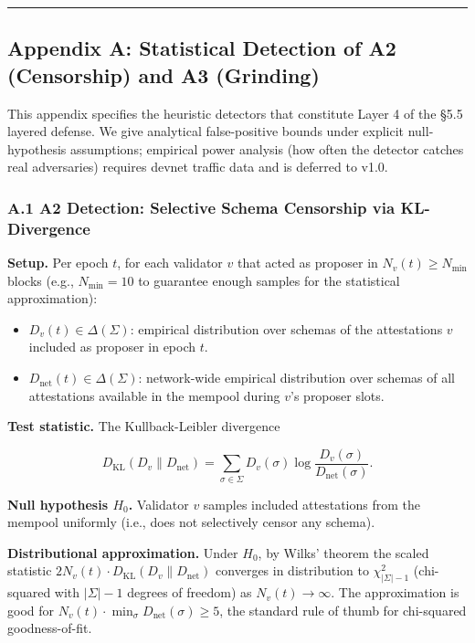 \documentclass[
  11pt,
]{article}
\providecommand{\tightlist}{%
  \setlength{\itemsep}{0pt}\setlength{\parskip}{0pt}}
\begin{document}
\begin{center}\rule{0.5\linewidth}{0.5pt}\end{center}

\subsection{Appendix A: Statistical Detection of A2 (Censorship) and A3
(Grinding)}\label{appendix-a-statistical-detection-of-a2-censorship-and-a3-grinding}

This appendix specifies the heuristic detectors that constitute Layer 4
of the §5.5 layered defense. We give analytical false-positive bounds
under explicit null-hypothesis assumptions; empirical power analysis
(how often the detector catches real adversaries) requires devnet
traffic data and is deferred to v1.0.

\subsubsection{A.1 A2 Detection: Selective Schema Censorship via
KL-Divergence}\label{a.1-a2-detection-selective-schema-censorship-via-kl-divergence}

\textbf{Setup.} Per epoch \(t\), for each validator \(v\) that acted as
proposer in \(N_v(t) \geq N_{\min}\) blocks (e.g., \(N_{\min} = 10\) to
guarantee enough samples for the statistical approximation):

\begin{itemize}
\tightlist
\item
  \(D_v(t) \in \Delta(\Sigma)\): empirical distribution over schemas of
  the attestations \(v\) included as proposer in epoch \(t\).
\item
  \(D_{\text{net}}(t) \in \Delta(\Sigma)\): network-wide empirical
  distribution over schemas of all attestations available in the mempool
  during \(v\)'s proposer slots.
\end{itemize}

\textbf{Test statistic.} The Kullback-Leibler divergence

\[D_{\text{KL}}(D_v \| D_{\text{net}}) = \sum_{\sigma \in \Sigma} D_v(\sigma) \log \frac{D_v(\sigma)}{D_{\text{net}}(\sigma)}.\]

\textbf{Null hypothesis \(H_0\).} Validator \(v\) samples included
attestations from the mempool uniformly (i.e., does not selectively
censor any schema).

\textbf{Distributional approximation.} Under \(H_0\), by Wilks' theorem
the scaled statistic
\(2 N_v(t) \cdot D_{\text{KL}}(D_v \| D_{\text{net}})\) converges in
distribution to \(\chi^2_{|\Sigma|-1}\) (chi-squared with \(|\Sigma|-1\)
degrees of freedom) as \(N_v(t) \to \infty\). The approximation is good
for \(N_v(t) \cdot \min_\sigma D_{\text{net}}(\sigma) \geq 5\), the
standard rule of thumb for chi-squared goodness-of-fit.
\end{document}

